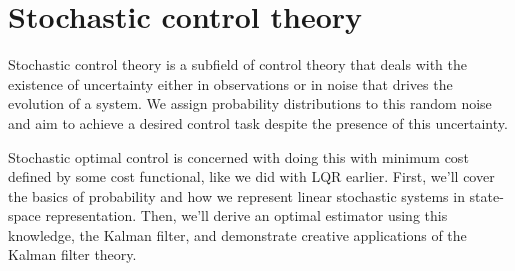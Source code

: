 
\chapter{Stochastic control theory}
\label{ch:stochastic_control_theory}

Stochastic control theory is a subfield of control theory that deals with the
existence of uncertainty either in observations or in noise that drives the
evolution of a \gls{system}. We assign probability distributions to this random
noise and aim to achieve a desired control task despite the presence of this
uncertainty.

Stochastic optimal control is concerned with doing this with minimum cost
defined by some cost functional, like we did with LQR earlier. First, we'll
cover the basics of probability and how we represent linear stochastic
\glspl{system} in state-space representation. Then, we'll derive an optimal
estimator using this knowledge, the Kalman filter, and demonstrate creative
applications of the Kalman filter theory.

\renewcommand*{\chapterpath}{\partpath/stochastic-control-theory}










